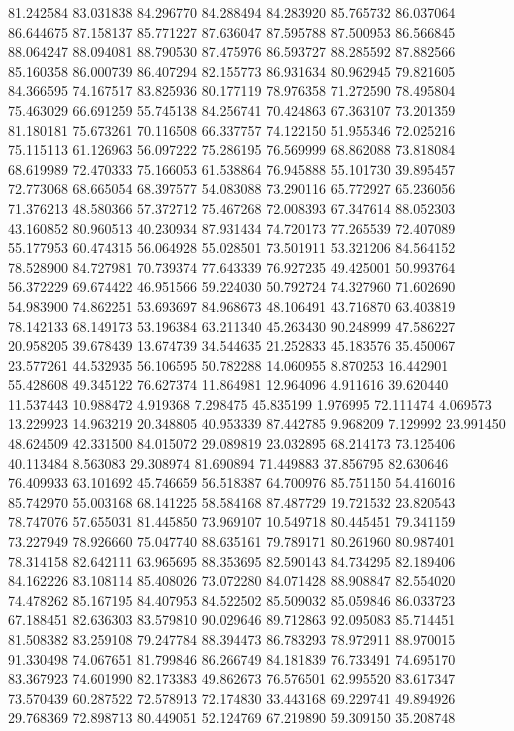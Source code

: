 81.242584
83.031838
84.296770
84.288494
84.283920
85.765732
86.037064
86.644675
87.158137
85.771227
87.636047
87.595788
87.500953
86.566845
88.064247
88.094081
88.790530
87.475976
86.593727
88.285592
87.882566
85.160358
86.000739
86.407294
82.155773
86.931634
80.962945
79.821605
84.366595
74.167517
83.825936
80.177119
78.976358
71.272590
78.495804
75.463029
66.691259
55.745138
84.256741
70.424863
67.363107
73.201359
81.180181
75.673261
70.116508
66.337757
74.122150
51.955346
72.025216
75.115113
61.126963
56.097222
75.286195
76.569999
68.862088
73.818084
68.619989
72.470333
75.166053
61.538864
76.945888
55.101730
39.895457
72.773068
68.665054
68.397577
54.083088
73.290116
65.772927
65.236056
71.376213
48.580366
57.372712
75.467268
72.008393
67.347614
88.052303
43.160852
80.960513
40.230934
87.931434
74.720173
77.265539
72.407089
55.177953
60.474315
56.064928
55.028501
73.501911
53.321206
84.564152
78.528900
84.727981
70.739374
77.643339
76.927235
49.425001
50.993764
56.372229
69.674422
46.951566
59.224030
50.792724
74.327960
71.602690
54.983900
74.862251
53.693697
84.968673
48.106491
43.716870
63.403819
78.142133
68.149173
53.196384
63.211340
45.263430
90.248999
47.586227
20.958205
39.678439
13.674739
34.544635
21.252833
45.183576
35.450067
23.577261
44.532935
56.106595
50.782288
14.060955
8.870253
16.442901
55.428608
49.345122
76.627374
11.864981
12.964096
4.911616
39.620440
11.537443
10.988472
4.919368
7.298475
45.835199
1.976995
72.111474
4.069573
13.229923
14.963219
20.348805
40.953339
87.442785
9.968209
7.129992
23.991450
48.624509
42.331500
84.015072
29.089819
23.032895
68.214173
73.125406
40.113484
8.563083
29.308974
81.690894
71.449883
37.856795
82.630646
76.409933
63.101692
45.746659
56.518387
64.700976
85.751150
54.416016
85.742970
55.003168
68.141225
58.584168
87.487729
19.721532
23.820543
78.747076
57.655031
81.445850
73.969107
10.549718
80.445451
79.341159
73.227949
78.926660
75.047740
88.635161
79.789171
80.261960
80.987401
78.314158
82.642111
63.965695
88.353695
82.590143
84.734295
82.189406
84.162226
83.108114
85.408026
73.072280
84.071428
88.908847
82.554020
74.478262
85.167195
84.407953
84.522502
85.509032
85.059846
86.033723
67.188451
82.636303
83.579810
90.029646
89.712863
92.095083
85.714451
81.508382
83.259108
79.247784
88.394473
86.783293
78.972911
88.970015
91.330498
74.067651
81.799846
86.266749
84.181839
76.733491
74.695170
83.367923
74.601990
82.173383
49.862673
76.576501
62.995520
83.617347
73.570439
60.287522
72.578913
72.174830
33.443168
69.229741
49.894926
29.768369
72.898713
80.449051
52.124769
67.219890
59.309150
35.208748
